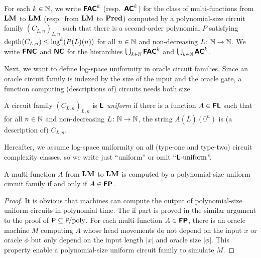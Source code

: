 \documentclass[envcountsame,orivec,oribibl]{llncs}
\begin{document}
\begin{definition}
 For each $k \in \mathbb N$, 
 we write $\text{\bfseries \sffamily \upshape FAC}^k$ (resp.\ $\text{\bfseries \sffamily \upshape AC}^k$) for the class of 
 multi-functions from $\mathbf{LM}$ to $\mathbf{LM}$ (resp.\ from $\mathbf{LM}$ to $\mathbf{Pred}$) computed by
 a polynomial-size circuit family $(C_{L,n})_{L,n}$ such that
 there is a second-order polynomial $P$ satisfying
 $\mathop{\rm depth}(C_{L,n}) \le \log^k(P(L)(n))$ 
 for all $n \in \mathbb N$ and non-decreasing
 $L \colon \mathbb N \to \mathbb N$.
 We write $\text{\bfseries \sffamily \upshape FNC}$ and $\text{\bfseries \sffamily \upshape NC}$ for the hierarchies
 $\bigcup_{k \in \mathbb N} \text{\bfseries \sffamily \upshape FAC}^k$ and $\bigcup_{k \in \mathbb N} \text{\bfseries \sffamily \upshape AC}^k$.
\end{definition}

Next, we want to define log-space uniformity in oracle circuit families.
Since an oracle circuit family is indexed by the size of the input and the oracle gate,
a function computing (descriptions of) circuits needs both size.

\begin{definition}
A circuit family $(C_{L,n})_{L,n}$ is \emph{$\text{\bfseries \sffamily \upshape L}$ uniform} if there is a function $A \in \text{\bfseries \sffamily \upshape FL}$ 
such that for all $n \in \mathbb N$ and non-decreasing $L \colon \mathbb N \to \mathbb N$, 
the string $A (\overline L) (0^n)$ is (a description of) $C_{L,n}$. 
\end{definition}

Hereafter, we assume log-space uniformity on all (type-one and type-two) 
circuit complexity classes, so we write just ``uniform'' or omit ``$\text{\bfseries \sffamily \upshape L}\text{-uniform}$''.

\begin{theorem}
\label{theorem:P-equals-L-uniform-P-poly}
A multi-function $A$ from $\mathbf{LM}$ to $\mathbf{LM}$ is computed by a polynomial-size
uniform circuit family if and only if $A \in \text{\bfseries \sffamily \upshape FP}$.
\end{theorem}

\begin{proof}
 It is obvious that machines can compute the output of
 polynomial-size uniform circuits in polynomial time.
 The if part is proved in the similar argument to the proof of
 $\mathsf{P} \subseteq \mathsf{P}\!\text{/poly}$.
 For each multi-function $A \in \text{\bfseries \sffamily \upshape FP}$, there is an oracle machine $M$
 computing $A$ whose head movements do not depend on the input $x$ or oracle
 $\phi$ but only depend on the input length $|x|$ and oracle size $|\phi|$.
 This property enable a polynomial-size uniform circuit family to simulate $M$.
\end{proof}
\end{document}
